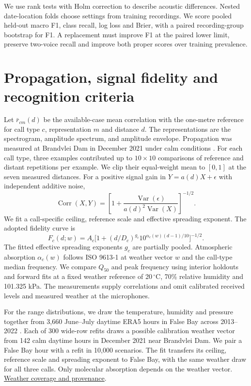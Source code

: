 \documentclass[11pt,a4paper]{article}
\newcommand{\mechanismevidence}[2]{\href{https://github.com/feiniao87968492-stack/apmcm-2026-problem-c/blob/83fcd5f9d38e8e3096b852ed4fc39931168dff17/#1}{#2}}
\begin{document}
We use rank tests with Holm correction to describe acoustic differences. Nested date-location folds choose settings from training recordings. We score pooled held-out macro F1, class recall, log loss and Brier, with a paired recording-group bootstrap for F1. A replacement must improve F1 at the paired lower limit, preserve two-voice recall and improve both proper scores over training prevalence.

\AcousticResults

\section{Propagation, signal fidelity and recognition criteria}
Let $\bar r_{cm}(d)$ be the available-case mean correlation with the one-metre reference for call type $c$, representation $m$ and distance $d$. The representations are the spectrogram, amplitude spectrum, and amplitude envelope. Propagation was measured at Brandvlei Dam in December 2021 under calm conditions \cite{fieldstudy}. For each call type, three examples contributed up to $10\times10$ comparisons of reference and distant repetitions per example. We clip their equal-weight mean to $[0,1]$ at the seven measured distances. For a positive signal gain in $Y=a(d)X+\epsilon$ with independent additive noise,
\[
\operatorname{Corr}(X,Y)=
\left[1+\frac{\operatorname{Var}(\epsilon)}{a(d)^2\operatorname{Var}(X)}\right]^{-1/2}.
\]
We fit a call-specific ceiling, reference scale and effective spreading exponent. The adopted fidelity curve is
\[
 F_c(d;w)=A_c\bigl[1+(d/D_c)^{g_c}10^{\alpha_c(w)(d-1)/10}\bigr]^{-1/2}.
\]
The fitted effective spreading exponents $g_c$ are partially pooled. Atmospheric absorption $\alpha_c(w)$ follows ISO 9613-1 \cite{iso9613} at weather vector $w$ and the call-type median frequency. We compare $Q_{50}$ and peak frequency using interior holdouts and forward fits at a fixed weather reference of 20\,$^\circ$C, 70\% relative humidity and 101.325 kPa. The measurements supply correlations and omit calibrated received levels and measured weather at the microphones.

For the range distributions, we draw the temperature, humidity and pressure together from 3,660 June--July daytime ERA5 hours in False Bay across 2013--2022 \cite{era5}. Each of 300 wide-row refits draws a possible calibration weather vector from 142 calm daytime hours in December 2021 near Brandvlei Dam. We pair a False Bay hour with a refit in 10,000 scenarios. The fit transfers its ceiling, reference scale and spreading exponent to False Bay, with the same weather draw for all three calls. Only molecular absorption depends on the weather vector. \mechanismevidence{sources/weather/README.md}{Weather coverage and provenance}.
\end{document}
